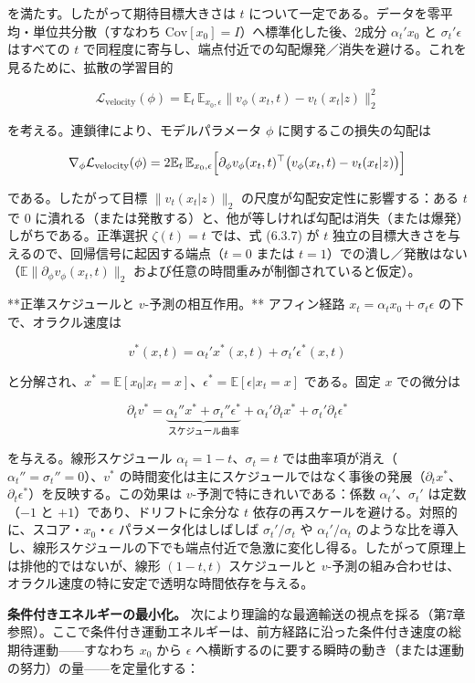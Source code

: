 を満たす。したがって期待目標大きさは $t$ について一定である。データを零平均・単位共分散（すなわち $\mathrm{Cov}[x_0]=I$）へ標準化した後、2成分 $\alpha_t'x_0$ と $\sigma_t'\epsilon$ はすべての $t$ で同程度に寄与し、端点付近での勾配爆発／消失を避ける。これを見るために、拡散の学習目的

\[
\mathcal{L}_{\mathrm{velocity}}(\phi)=\mathbb{E}_t\,\mathbb{E}_{x_0,\epsilon}\bigl\|v_\phi(x_t,t)-v_t(x_t|z)\bigr\|_2^2
\]


を考える。連鎖律により、モデルパラメータ $\phi$ に関するこの損失の勾配は

\[
\nabla_\phi\mathcal{L}_{\mathrm{velocity}}(\phi)=2\mathbb{E}_t\,\mathbb{E}_{x_0,\epsilon}\Bigl[\partial_\phi v_\phi(x_t,t)^\top\bigl(v_\phi(x_t,t)-v_t(x_t|z)\bigr)\Bigr]
\]


である。したがって目標 $\|v_t(x_t|z)\|_2$ の尺度が勾配安定性に影響する：ある $t$ で $0$ に潰れる（または発散する）と、他が等しければ勾配は消失（または爆発）しがちである。正準選択 $\zeta(t)=t$ では、式 (6.3.7) が $t$ 独立の目標大きさを与えるので、回帰信号に起因する端点（$t=0$ または $t=1$）での潰し／発散はない（$\mathbb{E}\|\partial_\phi v_\phi(x_t,t)\|_2$ および任意の時間重みが制御されていると仮定）。

**正準スケジュールと $v$-予測の相互作用。** アフィン経路 $x_t=\alpha_t x_0+\sigma_t\epsilon$ の下で、オラクル速度は

\[
v^*(x,t)=\alpha_t'x^*(x,t)+\sigma_t'\epsilon^*(x,t)
\]


と分解され、$x^*=\mathbb{E}[x_0|x_t=x]$、$\epsilon^*=\mathbb{E}[\epsilon|x_t=x]$ である。固定 $x$ での微分は

\[
\partial_t v^*=\underbrace{\alpha_t''x^*+\sigma_t''\epsilon^*}_{\text{スケジュール曲率}}+\alpha_t'\partial_t x^*+\sigma_t'\partial_t\epsilon^*
\]


を与える。線形スケジュール $\alpha_t=1-t$、$\sigma_t=t$ では曲率項が消え（$\alpha_t''=\sigma_t''=0$）、$v^*$ の時間変化は主にスケジュールではなく事後の発展（$\partial_t x^*$、$\partial_t\epsilon^*$）を反映する。この効果は $v$-予測で特にきれいである：係数 $\alpha_t'$、$\sigma_t'$ は定数（$-1$ と $+1$）であり、ドリフトに余分な $t$ 依存の再スケールを避ける。対照的に、スコア・$x_0$・$\epsilon$ パラメータ化はしばしば $\sigma_t'/\sigma_t$ や $\alpha_t'/\alpha_t$ のような比を導入し、線形スケジュールの下でも端点付近で急激に変化し得る。したがって原理上は排他的ではないが、線形 $(1-t,t)$ スケジュールと $v$-予測の組み合わせは、オラクル速度の特に安定で透明な時間依存を与える。

\textbf{条件付きエネルギーの最小化。} 次により理論的な最適輸送の視点を採る（第7章参照）。ここで条件付き運動エネルギーは、前方経路に沿った条件付き速度の総期待運動——すなわち $x_0$ から $\epsilon$ へ横断するのに要する瞬時の動き（または運動の努力）の量——を定量化する：

